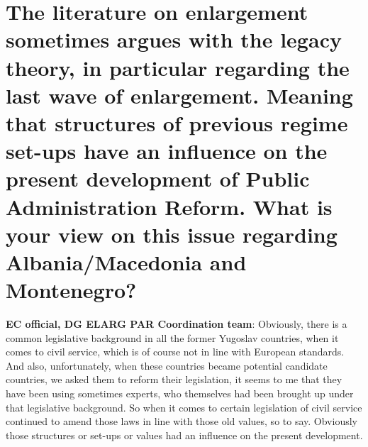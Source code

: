 \section{The literature on enlargement sometimes argues with the legacy theory, in particular regarding the last wave of enlargement. Meaning that structures of previous regime set-ups have an influence on the present development of Public Administration Reform. What is your view on this issue regarding Albania/Macedonia and Montenegro? }
\textbf{EC official, DG ELARG PAR Coordination team}: Obviously, there is a common legislative background in all the former Yugoslav countries, when it comes to civil service, which is of course not in line with European standards. And also, unfortunately, when these countries became potential candidate countries, we asked them to reform their legislation, it seems to me that they have been using sometimes experts, who themselves had been brought up under that legislative background. So when it comes to certain legislation of civil service continued to amend those laws in line with those old values, so to say. Obviously those structures or set-ups or values had an influence on the present development. \\
